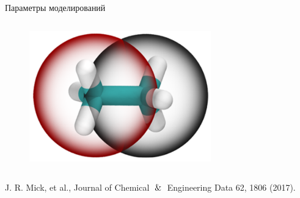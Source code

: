 \documentclass{beamer}
\begin{document}
\begin{frame}{Параметры моделирований}
{\begin{columns}
\begin{column}{0.5\linewidth}
\vspace{1.0cm}

\begin{figure}
\centering
\includegraphics[width=0.7\textwidth]{ethane2.png}
\end{figure}

\vspace{0.5cm}

\end{column}
\end{columns}

}

\tiny{J. R. Mick, et al., Journal of Chemical $\And$ Engineering Data 62, 1806 (2017).}

\end{frame}
\end{document}

